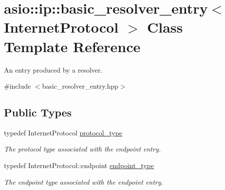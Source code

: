 \hypertarget{classasio_1_1ip_1_1basic__resolver__entry}{}\section{asio\+:\+:ip\+:\+:basic\+\_\+resolver\+\_\+entry$<$ Internet\+Protocol $>$ Class Template Reference}
\label{classasio_1_1ip_1_1basic__resolver__entry}


An entry produced by a resolver.  




{\ttfamily \#include $<$basic\+\_\+resolver\+\_\+entry.\+hpp$>$}

\subsection*{Public Types}
\begin{DoxyCompactItemize}
\item 
typedef Internet\+Protocol \hyperlink{classasio_1_1ip_1_1basic__resolver__entry_ae391844bc3cacf20820b4090a1389a44}{protocol\+\_\+type}
\begin{DoxyCompactList}\small\item\em The protocol type associated with the endpoint entry. \end{DoxyCompactList}\item 
typedef Internet\+Protocol\+::endpoint \hyperlink{classasio_1_1ip_1_1basic__resolver__entry_ad0d9f222f3a4897afa941c35e1a90074}{endpoint\+\_\+type}
\begin{DoxyCompactList}\small\item\em The endpoint type associated with the endpoint entry. \end{DoxyCompactList}\end{DoxyCompactItemize}
